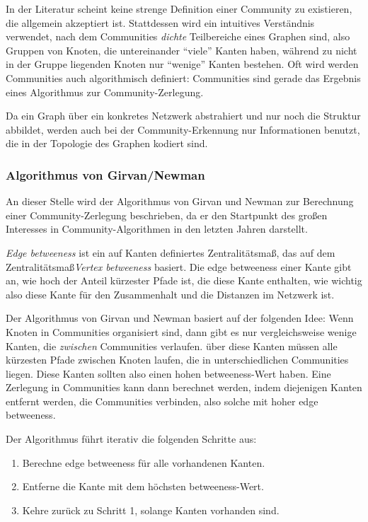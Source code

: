 In der Literatur scheint keine strenge Definition einer Community zu
existieren, die allgemein akzeptiert ist. Stattdessen wird ein
intuitives Verständnis verwendet, nach dem Communities \emph{dichte}
Teilbereiche eines Graphen sind, also Gruppen von Knoten, die
untereinander "`viele"' Kanten haben, während zu nicht in der Gruppe
liegenden Knoten nur "`wenige"' Kanten bestehen. Oft wird werden
Communities auch algorithmisch definiert: Communities sind gerade das
Ergebnis eines Algorithmus zur Community-Zerlegung.

Da ein Graph über ein konkretes Netzwerk abstrahiert und nur noch
die Struktur abbildet, werden auch bei der Community-Erkennung nur
Informationen benutzt, die in der Topologie des Graphen kodiert sind. 

\subsubsection{Algorithmus von Girvan/Newman}
\label{sec:algor-von-girv-1}

An dieser Stelle wird der Algorithmus von Girvan
und Newman\cite{Newman2004} zur Berechnung einer Community-Zerlegung
beschrieben, da er den Startpunkt des großen Interesses in
Community-Algorithmen in den letzten Jahren darstellt.

\emph{Edge betweeness} ist ein auf Kanten definiertes
Zentralitätsma\ss, das auf dem Zentralitätsma\ss \emph{Vertex
  betweeness} \cite{Koschutzki2004a} basiert. Die edge betweeness
einer Kante gibt an, wie hoch der Anteil kürzester Pfade ist, die
diese Kante enthalten, wie wichtig also diese Kante für den
Zusammenhalt und die Distanzen im Netzwerk ist.

Der Algorithmus von Girvan und Newman basiert auf der folgenden Idee:
Wenn Knoten in Communities organisiert sind, dann gibt es nur
vergleichsweise wenige Kanten, die \emph{zwischen} Communities
verlaufen. über diese Kanten müssen alle kürzesten Pfade
zwischen Knoten laufen, die in unterschiedlichen Communities
liegen. Diese Kanten sollten also einen hohen betweeness-Wert
haben. Eine Zerlegung in Communities kann dann berechnet werden, indem
diejenigen Kanten entfernt werden, die Communities verbinden, also
solche mit hoher edge betweeness.

Der Algorithmus führt iterativ die folgenden Schritte aus:

\begin{enumerate}
\item Berechne edge betweeness für alle vorhandenen Kanten.
\item Entferne die Kante mit dem höchsten betweeness-Wert.
\item Kehre zurück zu Schritt 1, solange Kanten vorhanden sind.
\end{enumerate}

